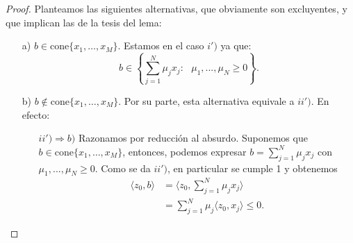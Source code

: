 \begin{proof}
Planteamos las siguientes alternativas, que obviamente son excluyentes, y que implican las de la tesis del lema:
\begin{itemize}
	\item[a)] $b \in \mathrm{cone}\{x_1,\dots, x_M \} $. Estamos en el caso $ i') $  ya que:
	\[
	b \in \left\lbrace \sum_{j=1}^{N}{\mu_j x_j } : \text{ } \mu_1,...,\mu_N \geq 0 \right\rbrace .
	\]
	\item[b)] $ b \notin \mathrm{cone}\{x_1,\dots, x_M \} $. Por su parte, esta alternativa equivale a $ ii') $. En efecto: 
	
	\begin{itemize}
	\item[$ ii') \Longrightarrow b) $] Razonamos por reducción al absurdo. Suponemos que $ b \in \mathrm{cone}\{x_1,\dots, x_M \} $, entonces, podemos expresar $ b =  \sum_{j=1}^{N}{\mu_j x_j } $ con $ \mu_1,...,\mu_N \geq 0$. Como se da $ ii') $, en particular se cumple 1 y obtenemos
	\begin{equation*}
	\begin{split}
		\langle z_0, b \rangle & = \langle z_0, \sum_{j=1}^{N}{\mu_j x_j } \rangle \\
		&= \sum_{j=1}^{N}{\mu_j\langle z_0, x_j \rangle } \leq 0.
	\end{split}
	\end{equation*}
	

\end{itemize}
\end{itemize}
\end{proof}
